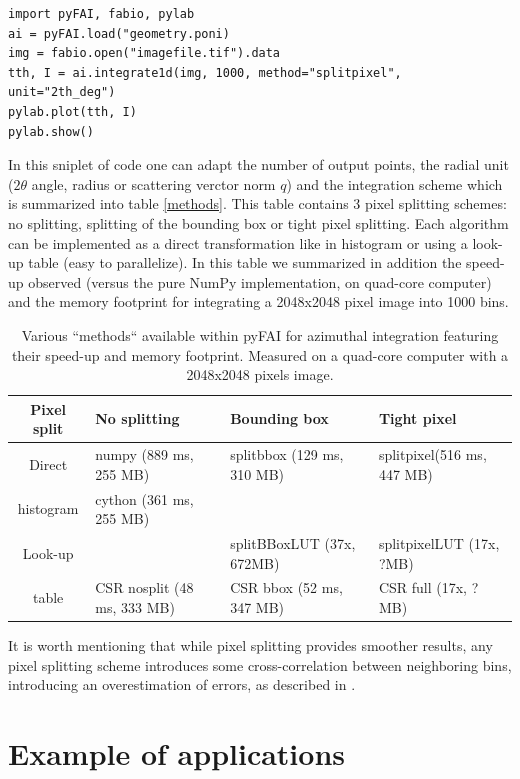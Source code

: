 \documentclass[preprint]{iucr}
\begin{document}
\begin{verbatim}
import pyFAI, fabio, pylab
ai = pyFAI.load("geometry.poni)
img = fabio.open("imagefile.tif").data
tth, I = ai.integrate1d(img, 1000, method="splitpixel", unit="2th_deg")
pylab.plot(tth, I)
pylab.show()
\end{verbatim}
In this sniplet of code one can adapt the number of output points, 
the radial unit ($2\theta$ angle, radius or scattering verctor norm $q$) and the
integration scheme which is summarized into table \ref{methods}.
This table contains 3 pixel splitting schemes: no splitting, splitting of the
bounding box or tight pixel splitting. Each algorithm can be implemented as a
direct transformation like in histogram or using a look-up table (easy to
parallelize).
In this table we summarized in addition the speed-up observed (versus the pure
NumPy \cite{numpy} implementation, on  quad-core computer) and the memory
footprint for integrating a 2048x2048 pixel image into 1000 bins.

\begin{table}
\caption{Various ``methods`` available within pyFAI for azimuthal integration
featuring their speed-up and memory footprint. Measured on a quad-core
computer with a 2048x2048 pixels image.}
\begin{tabular}[pos]{|c|l|l|l|}
\hline
Pixel split& No splitting & Bounding box & Tight pixel \\
\hline
Direct    & numpy (889 ms, 255 MB) & splitbbox (129 ms, 310 MB) &
splitpixel(516 ms, 447 MB)\\
histogram & cython (361 ms, 255 MB) &                       &                \\
\hline
Look-up   &       & splitBBoxLUT (37x, 672MB) & splitpixelLUT (17x, ?MB)\\
table     & CSR nosplit (48 ms, 333 MB)       & CSR bbox (52 ms, 347
MB) & CSR full (17x, ?MB)\\
\hline
\end{tabular}
\label{table:methods}
\end{table}

It is worth mentioning that while pixel splitting provides smoother results, any
pixel splitting scheme introduces some cross-correlation between neighboring
bins, introducing an overestimation of errors, as described in \cite{billinge2014}.

\section{Example of applications}
\end{document}
